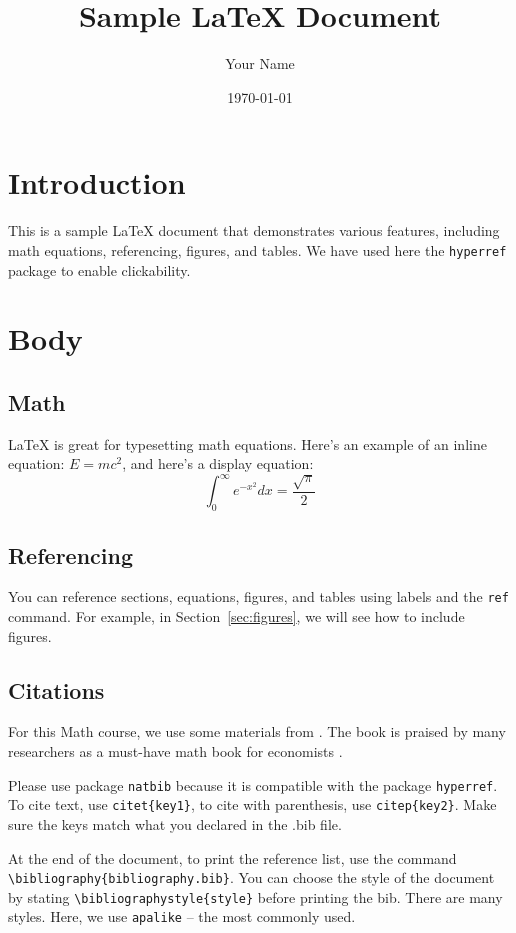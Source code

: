 \documentclass[11p,a4paper]{article}
\begin{document}
\title{Sample LaTeX Document}
\author{Your Name}
\date{\today}

\maketitle

\section{Introduction}
This is a sample LaTeX document that demonstrates various features, including math equations, referencing, figures, and tables. We have used here the \texttt{hyperref} package to enable clickability.

\section{Body}
\subsection{Math}
LaTeX is great for typesetting math equations. Here's an example of an inline equation: $E = mc^2$, and here's a display equation:
\begin{equation}
    \int_{0}^{\infty} e^{-x^2} dx = \frac{\sqrt{\pi}}{2}
\end{equation}

\subsection{Referencing}
You can reference sections, equations, figures, and tables using labels and the \texttt{ref} command. For example, in Section~\ref{sec:figures}, we will see how to include figures.

\subsection{Citations}
For this Math course, we use some materials from \citet{simon1994mathematics}. The book is praised by many researchers as a must-have math book for economists \citep{sydsaeter2008further}. 

Please use package \texttt{natbib} because it is compatible with the package \texttt{hyperref}. To cite text, use \texttt{citet\{key1\}}, to cite with parenthesis, use \texttt{citep\{key2\}}. Make sure the keys match what you declared in the .bib file. 

At the end of the document, to print the reference list, use the command \texttt{\textbackslash bibliography\{bibliography.bib\}}. You can choose the style of the document by stating \texttt{\textbackslash bibliographystyle\{style\}} before printing the bib. There are many styles. Here, we use \texttt{apalike} -- the most commonly used.
\end{document}
